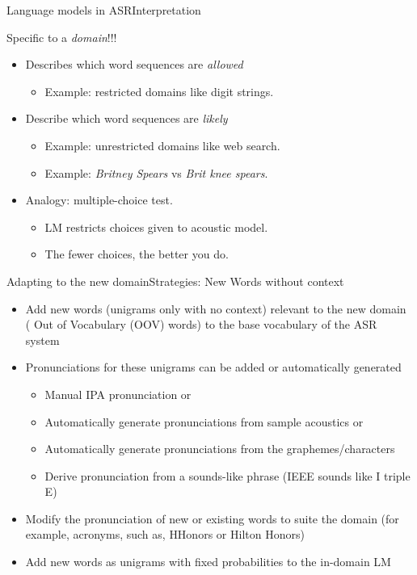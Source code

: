 \begin{frame} {Language models in ASR}{Interpretation}

Specific to a \emph{domain}!!!

\begin{itemize}
\item Describes which word sequences are \emph{allowed}

\begin{itemize}
    \item Example: restricted domains like digit strings.
\end{itemize}

\item  Describe which word sequences are \emph{likely}
\begin{itemize}
   \item Example: unrestricted domains like web search.
   \item Example: {\it Britney Spears} vs {\it Brit knee spears}.
\end{itemize}

\item Analogy: multiple-choice test.
\begin{itemize}
    \item LM restricts choices given to acoustic model.
    \item The fewer choices, the better you do.
\end{itemize}

\end{itemize}

\end{frame}
    
\begin{frame}{Adapting to the new domain}{Strategies: New Words without context}

\begin{itemize}
\item Add new words (unigrams only with no context) relevant to the new domain ({\color{red} Out of Vocabulary} (OOV) words) to the base vocabulary of the ASR system
\item Pronunciations for these unigrams can be added or automatically generated

\begin{itemize}
\item Manual IPA pronunciation or
\item Automatically generate pronunciations from sample acoustics or
\item Automatically generate pronunciations from the graphemes/characters
\item Derive pronunciation from a sounds-like phrase (IEEE sounds like {\color{red} I triple E})
\end{itemize}

\item Modify  the pronunciation of new or existing words to suite the domain (for example, acronyms, such as, {\color{blue} HHonors} or {\color{blue} Hilton Honors})
\item  Add new words as unigrams with fixed probabilities to the {\color{blue} in-domain LM}
\end{itemize}
\end{frame}

